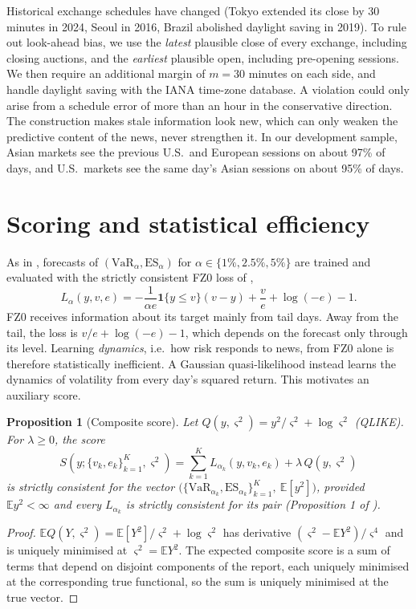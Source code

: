\documentclass[11pt]{article}
\newtheorem{proposition}{Proposition}
\theoremstyle{remark}
\newcommand{\1}{\mathbf{1}}
\newcommand{\E}{\mathbb{E}}
\newcommand{\VaR}{\mathrm{VaR}}
\newcommand{\ES}{\mathrm{ES}}
\begin{document}
Historical exchange schedules have changed (Tokyo extended its close by 30 minutes in 2024, Seoul in 2016, Brazil abolished daylight saving in 2019). To rule out look-ahead bias, we use the \emph{latest} plausible close of every exchange, including closing auctions, and the \emph{earliest} plausible open, including pre-opening sessions. We then require an additional margin of $m=30$ minutes on each side, and handle daylight saving with the IANA time-zone database. A violation could only arise from a schedule error of more than an hour in the conservative direction. The construction makes stale information look new, which can only weaken the predictive content of the news, never strengthen it. In our development sample, Asian markets see the previous U.S.\ and European sessions on about 97\% of days, and U.S.\ markets see the same day's Asian sessions on about 95\% of days.

\section{Scoring and statistical efficiency}\label{sec:theory}
As in \citet{agrawal2026learning}, forecasts of $(\VaR_\alpha,\ES_\alpha)$ for $\alpha\in\{1\%,2.5\%,5\%\}$ are trained and evaluated with the strictly consistent FZ0 loss of \citet{patton2019dynamic},
\[
L_\alpha(y,v,e)=-\frac{1}{\alpha e}\1\{y\le v\}(v-y)+\frac{v}{e}+\log(-e)-1 .
\]
FZ0 receives information about its target mainly from tail days. Away from the tail, the loss is $v/e+\log(-e)-1$, which depends on the forecast only through its level. Learning \emph{dynamics}, i.e.\ how risk responds to news, from FZ0 alone is therefore statistically inefficient. A Gaussian quasi-likelihood instead learns the dynamics of volatility from every day's squared return. This motivates an auxiliary score.

\begin{proposition}[Composite score]\label{prop:composite}
Let $Q(y,\varsigma^2)=y^2/\varsigma^2+\log\varsigma^2$ (QLIKE). For $\lambda\ge0$, the score
\[
S(y;\{v_k,e_k\}_{k=1}^K,\varsigma^2)=\sum_{k=1}^K L_{\alpha_k}(y,v_k,e_k)+\lambda\,Q(y,\varsigma^2)
\]
is strictly consistent for the vector $\bigl(\{\VaR_{\alpha_k},\ES_{\alpha_k}\}_{k=1}^K,\ \E[y^2]\bigr)$, provided $\E y^2<\infty$ and every $L_{\alpha_k}$ is strictly consistent for its pair (Proposition 1 of \citealp{agrawal2026learning}).
\end{proposition}
\begin{proof}
$\E Q(Y,\varsigma^2)=\E[Y^2]/\varsigma^2+\log\varsigma^2$ has derivative $(\varsigma^2-\E Y^2)/\varsigma^4$ and is uniquely minimised at $\varsigma^2=\E Y^2$. The expected composite score is a sum of terms that depend on disjoint components of the report, each uniquely minimised at the corresponding true functional, so the sum is uniquely minimised at the true vector.
\end{proof}
\end{document}
